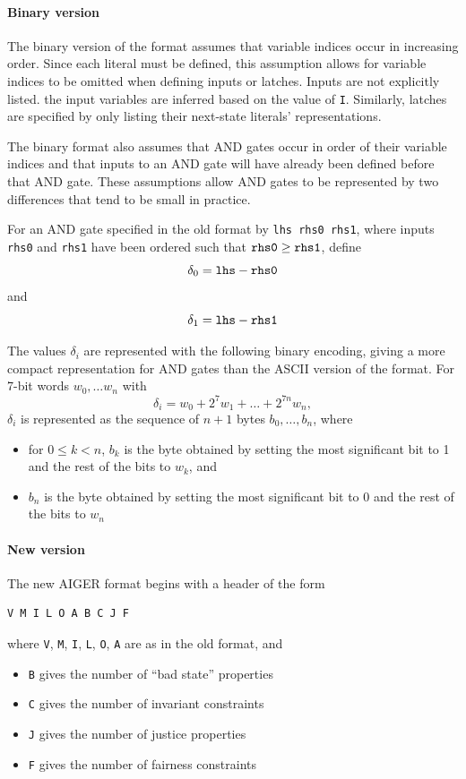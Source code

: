 \documentclass[12pt,a4paper,twoside,openright]{report}
\begin{document}
{\paragraph{Binary version}{
The binary version of the format assumes that variable indices
occur in increasing order. Since each literal must be defined, this assumption
allows for variable indices to be omitted when defining inputs or latches.
Inputs are not explicitly listed. the input variables are inferred based on
the value of \verb,I,.
Similarly, latches are specified by only listing their next-state literals'
representations.

The binary format also assumes that AND gates occur in order of their
variable indices and that inputs to an AND gate will
have already been defined before that AND gate.
These assumptions allow AND gates to be represented by two differences
that tend to be small in practice.

For an AND gate specified in the old format by \verb,lhs rhs0 rhs1,,
where inputs \verb,rhs0, and \verb,rhs1, have been ordered such that
$\verb,rhs0, \geq \verb,rhs1,$, define
$$\delta_0 = \verb,lhs, - \verb,rhs0,$$
and
$$\delta_1 = \verb,lhs, - \verb,rhs1,$$

The values $\delta_i$ are represented with the following binary
encoding, giving a more compact representation for AND gates than
the ASCII version of the format.
For 7-bit words $w_0, \ldots w_n$ with
$$\delta_i = w_0 + 2^7w_1 + \ldots + 2^{7n}w_n,$$
$\delta_i$ is represented as the sequence of $n + 1$ bytes
$b_0, \ldots, b_n$, where
\begin{itemize}
\item for $0 \leq k < n$, $b_k$ is the byte obtained by setting the most
significant bit to 1 and the rest of the bits to $w_k$, and
\item $b_n$ is the byte obtained by setting the most
significant bit to 0 and the rest of the bits to $w_n$
\end{itemize}}

\paragraph{New version} {
The new AIGER format begins with a header of the form
\begin{verbatim}
V M I L O A B C J F
\end{verbatim}
where \verb,V,, \verb,M,, \verb,I,, \verb,L,, \verb,O,, \verb,A, are as
in the old format, and
\begin{itemize}
\item \verb,B, gives the number of ``bad state'' properties
\item \verb,C, gives the number of invariant constraints
\item \verb,J, gives the number of justice properties
\item \verb,F, gives the number of fairness constraints
\end{itemize}

}}
\end{document}
